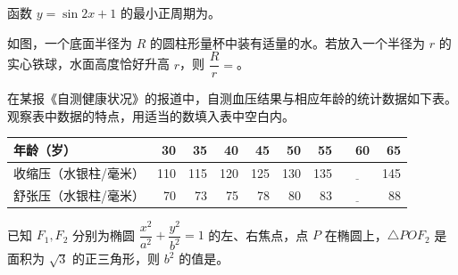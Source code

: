 \begin{question}
函数 $y=\sin 2x+1$ 的最小正周期为\underline{\qquad}。

\Needspace{0.4\textheight}
\end{question}
\begin{question}
如图，一个底面半径为 $R$ 的圆柱形量杯中装有适量的水。若放入一个半径为 $r$ 的实心铁球，水面高度恰好升高 $r$，则 $\dfrac Rr=$\underline{\qquad}。
\nopagebreak[4]
\begin{center}\end{center}
\nopagebreak[4]
\end{question}
\begin{question}
在某报《自测健康状况》的报道中，自测血压结果与相应年龄的统计数据如下表。观察表中数据的特点，用适当的数填入表中空白内。

\begin{center}
\begingroup\setlength{\tabcolsep}{4pt}
\begin{tabular}{lrrrrrrrr}
\toprule
年龄（岁） & 30 & 35 & 40 & 45 & 50 & 55 & 60 & 65 \\
\midrule
收缩压（水银柱/毫米） & 110 & 115 & 120 & 125 & 130 & 135 & $\underline{\qquad}$ & 145 \\
舒张压（水银柱/毫米） & 70 & 73 & 75 & 78 & 80 & 83 & $\underline{\qquad}$ & 88 \\
\bottomrule
\end{tabular}
\endgroup
\end{center}

\end{question}
\begin{question}
已知 $F_1,F_2$ 分别为椭圆 $\dfrac{x^2}{a^2}+\dfrac{y^2}{b^2}=1$ 的左、右焦点，点 $P$ 在椭圆上，$\triangle POF_2$ 是面积为 $\sqrt3$ 的正三角形，则 $b^2$ 的值是\underline{\qquad}。

\end{question}

